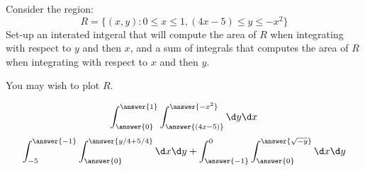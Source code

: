 \documentclass{ximera}
\author{Bart Snapp}
\begin{document}
\begin{exercise}
  Consider the region:
  \[
  R=\{(x,y): 0\le x\le 1, (4x-5)\le y\le -x^2\}
  \]
  Set-up an interated intgeral that will compute the area of $R$ when
  integrating with respect to $y$ and then $x$, and a sum of integrals
  that computes the area of $R$ when integrating with respect to $x$ and then $y$.
  \begin{hint}
    You may wish to plot $R$.
  \end{hint}
  \begin{prompt}
    \[
    \int_{\answer{0}}^{\answer{1}} \int_{\answer{(4x-5)}}^{\answer{-x^2}} \d y \d x
    \]
    \[
    \int_{-5}^{\answer{-1}} \int_{\answer{0}}^{\answer{y/4+5/4}} \d x \d y + 
    \int_{\answer{-1}}^{0} \int_{\answer{0}}^{\answer{\sqrt{-y}}} \d x \d y
    \]
  \end{prompt}
\end{exercise}
\end{document}

